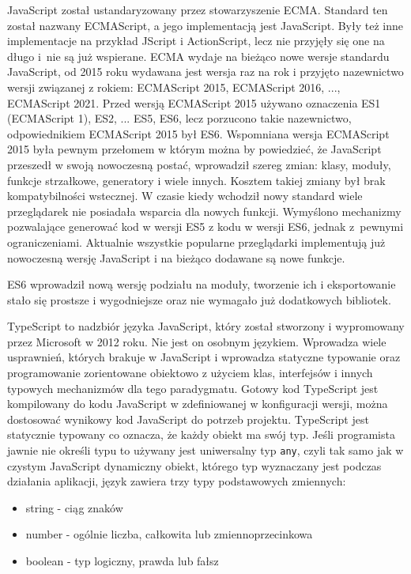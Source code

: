 \documentclass[12pt,a4paper,oneside]{book}
\begin{document}
JavaScript został ustandaryzowany przez stowarzyszenie ECMA. Standard ten został nazwany ECMAScript, a jego implementacją jest JavaScript. Były też inne implementacje na przykład JScript i ActionScript, lecz nie przyjęły się one na długo i~nie są już wspierane. ECMA wydaje na bieżąco nowe wersje standardu JavaScript, od 2015 roku wydawana jest wersja raz na rok i przyjęto nazewnictwo wersji związanej z rokiem: ECMAScript 2015, ECMAScript 2016, ..., ECMAScript 2021. Przed wersją ECMAScript 2015 używano oznaczenia ES1 (ECMAScript 1), ES2, ... ES5, ES6, lecz porzucono takie nazewnictwo, odpowiednikiem ECMAScript 2015 był ES6. Wspomniana wersja ECMAScript 2015 była pewnym przełomem w którym można by powiedzieć, że JavaScript przeszedł w swoją nowoczesną postać, wprowadził szereg zmian: klasy, moduły, funkcje strzałkowe, generatory i wiele innych. Kosztem takiej zmiany był brak kompatybilności wstecznej. W czasie kiedy wchodził nowy standard wiele przeglądarek nie posiadała wsparcia dla nowych funkcji. Wymyślono mechanizmy pozwalające generować kod w wersji ES5 z kodu w wersji ES6, jednak z~pewnymi ograniczeniami. Aktualnie wszystkie popularne przeglądarki implementują już nowoczesną wersję JavaScript i na bieżąco dodawane są nowe funkcje.

ES6 wprowadził nową wersję podziału na moduły, tworzenie ich i eksportowanie stało się prostsze i wygodniejsze oraz nie wymagało już dodatkowych bibliotek.

TypeScript to nadzbiór języka JavaScript, który został stworzony i wypromowany przez Microsoft w 2012 roku. Nie jest on osobnym językiem. Wprowadza wiele usprawnień, których brakuje w JavaScript i wprowadza statyczne typowanie oraz programowanie zorientowane obiektowo z użyciem klas, interfejsów i innych typowych mechanizmów dla tego paradygmatu. Gotowy kod TypeScript jest kompilowany do kodu JavaScript w zdefiniowanej w konfiguracji wersji, można dostosować wynikowy kod JavaScript do potrzeb projektu. TypeScript jest statycznie typowany co oznacza, że każdy obiekt ma swój typ. Jeśli programista jawnie nie określi typu to używany jest uniwersalny typ \texttt{any}, czyli tak samo jak w czystym JavaScript dynamiczny obiekt, którego typ wyznaczany jest podczas działania aplikacji, język zawiera trzy typy podstawowych zmiennych:

\begin{itemize}
  \item string - ciąg znaków
  \item number - ogólnie liczba, całkowita lub zmiennoprzecinkowa
  \item boolean - typ logiczny, prawda lub fałsz
\end{itemize}
\end{document}
